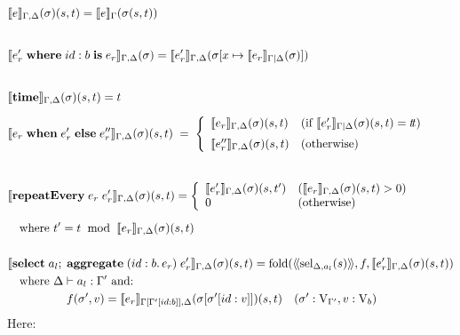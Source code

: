 \begin{align*}
& \llbracket e \rrbracket_{\Gamma,\Delta}(\sigma ) (s, t) = \llbracket e \rrbracket_{\Gamma}(\sigma(s,t)) \\[0.2cm]\\
&\llbracket e'_r \; \mathbf{where} \; id:b \; \mathbf{is} \; e_r \rrbracket_{\Gamma,\Delta}(\sigma )  = \llbracket e'_r \rrbracket_{\Gamma,\Delta}(\sigma[x \mapsto \llbracket e_r \rrbracket_{\Gamma|\Delta}(\sigma )]) \\[0.2cm]\\
& \llbracket \mathbf{time} \rrbracket_{\Gamma,\Delta}(\sigma ) (s, t) = t \\[0.2cm]
& \llbracket e_r \; \mathbf{when} \; e'_r \; \mathbf{else} \; e''_r \rrbracket_{\Gamma,\Delta}(\sigma ) (s, t) \;  = \; 
\left \{ \begin{array}{ll}
\llbracket e_r \rrbracket_{\Gamma,\Delta}(\sigma ) (s, t)  & (\mbox{if } \llbracket e'_r \rrbracket_{\Gamma|\Delta}(\sigma ) (s, t) = t\!t) \\[0.2cm]
\llbracket e''_r \rrbracket_{\Gamma,\Delta}(\sigma ) (s, t)  & (\mbox{otherwise})\end{array} \right . \\[0.2cm]\\
& \llbracket \mathbf{repeatEvery} \; e_r \; e_r' \rrbracket_{\Gamma,\Delta}(\sigma ) (s, t) = 
          \left \{\begin{array}{ll}    
                       \llbracket e_r' \rrbracket_{\Gamma,\Delta}(\sigma) (s, t') & (\llbracket e_r \rrbracket_{\Gamma,\Delta}(\sigma ) (s, t) > 0)\\
                       0 & (\mbox{otherwise})
                               \end{array}
                      \right . \\[0.2cm]                  
&\hspace{10pt} \mbox{where } t' = t \; \; \mathrm{mod} \; \; \llbracket e_r \rrbracket_{\Gamma,\Delta}(\sigma ) (s, t) \\ \\
&\llbracket \mathbf{select} \; a_l;\; \mathbf{aggregate} \; ( id:b.\, e_r) \; e_r' \rrbracket_{\Gamma,\Delta}(\sigma)(s,t) = \mathrm{fold}(\langle\!\langle
 \mathrm{sel}_{\Delta,a_l}(s)\rangle\!\rangle, f, \llbracket e'_r \rrbracket_{\Gamma,\Delta}(\sigma)(s,t)) \\
&\hspace{10pt} \mbox{where }\Delta \vdash a_l:\Gamma' \mbox{ and:} \\
&\hspace{50pt} f(\sigma',v) = \llbracket e_r \rrbracket_{\Gamma[\Gamma'[ id:b]],\Delta}(\sigma[\sigma'[id:v]])(s,t) \quad (\sigma': \mathrm{V}_{\Gamma'}, v : \mathrm{V}_{b})\\
\end{align*}
Here:
